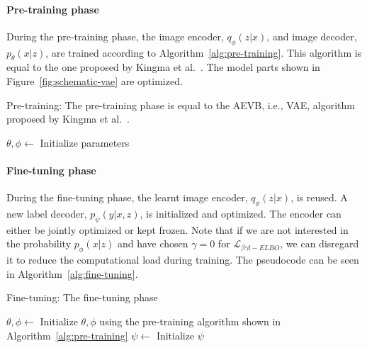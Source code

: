 \paragraph*{Pre-training phase} During the pre-training phase, the image encoder, $q_\phi(z|x)$, and image decoder, $p_\theta(x|z)$, are trained according to Algorithm~\ref{alg:pre-training}. This algorithm is equal to the one proposed by Kingma et al.~\cite{kingma2014autoencodingvariationalbayes}. The model parts shown in Figure~\ref{fig:schematic-vae} are optimized.

\begin{algorithm}
    \caption{Pre-training: The pre-training phase is equal to the AEVB, i.e., VAE, algorithm proposed by Kingma et al.~\cite{kingma2014autoencodingvariationalbayes}.}
    $\theta, \phi \gets$ Initialize parameters\;
    \Return{$\theta, \phi$}
    \label{alg:pre-training}
\end{algorithm}


\paragraph*{Fine-tuning phase} During the fine-tuning phase, the learnt image encoder, $q_\phi(z|x)$, is reused. A new label decoder, $p_\psi(y|x, z)$, is initialized and optimized. The encoder can either be jointly optimized or kept frozen. Note that if we are not interested in the probability $p_\phi(x | z)$ and have chosen $\gamma = 0$ for $\mathcal{L}_{\beta\gamma l-ELBO}$, we can disregard it to reduce the computational load during training. The pseudocode can be seen in Algorithm~\ref{alg:fine-tuning}.

\begin{algorithm}
    \caption{Fine-tuning: The fine-tuning phase }
    $\theta, \phi \gets$ Initialize $\theta, \phi$ using the pre-training algorithm shown in Algorithm~\ref{alg:pre-training}\;
    $\psi \gets$ Initialize $\psi$\;
    \Return{$\theta, \psi, \phi$}
    \label{alg:fine-tuning}
\end{algorithm}


